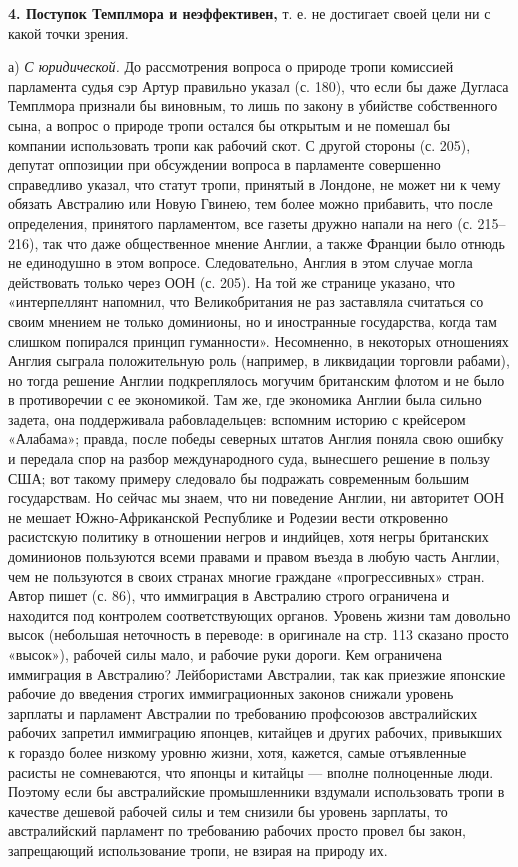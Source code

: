 \textbf{4.  Поступок Темплмора  и  неэффективен,} т.  е. не  достигает
своей цели ни с какой точки зрения.

а)  \emph{С  юридической.} До  рассмотрения  вопроса  о природе  тропи
комиссией парламента  судья сэр Артур  правильно указал (с.  180), что
если бы даже Дугласа Темплмора признали бы виновным, то лишь по закону
в  убийстве собственного  сына, а  вопрос о  природе тропи  остался бы
открытым  и не  помешал  бы компании  использовать  тропи как  рабочий
скот.  С другой  стороны (с.  205), депутат  оппозиции при  обсуждении
вопроса в парламенте совершенно  справедливо указал, что статут тропи,
принятый в  Лондоне, не может  ни к  чему обязать Австралию  или Новую
Гвинею, тем  более можно  прибавить, что после  определения, принятого
парламентом, все газеты  дружно напали на него (с.  215--216), так что
даже  общественное  мнение Англии,  а  также  Франции было  отнюдь  не
единодушно в этом  вопросе. Следовательно, Англия в  этом случае могла
действовать только через ООН (с. 205). На той же странице указано, что
«интерпеллянт напомнил, что Великобритания не раз заставляла считаться
со своим  мнением не только  доминионы, но и  иностранные государства,
когда  там  слишком  попирался   принцип  гуманности».  Несомненно,  в
некоторых отношениях  Англия сыграла  положительную роль  (например, в
ликвидации  торговли рабами),  но тогда  решение Англии  подкреплялось
могучим британским  флотом и не  было в противоречии с  ее экономикой.
Там  же, где  экономика Англии  была сильно  задета, она  поддерживала
рабовладельцев: вспомним историю с  крейсером «Алабама»; правда, после
победы северных  штатов Англия поняла  свою ошибку и передала  спор на
разбор международного суда, вынесшего решение в пользу США; вот такому
примеру  следовало  бы  подражать  современным  большим  государствам.
Но  сейчас  мы  знаем,  что  ни поведение  Англии,  ни  авторитет  ООН
не  мешает  Южно-Африканской  Республике и  Родезии  вести  откровенно
расистскую  политику  в  отношении   негров  и  индийцев,  хотя  негры
британских доминионов пользуются всеми правами и правом въезда в любую
часть  Англии,  чем не  пользуются  в  своих странах  многие  граждане
«прогрессивных» стран. Автор пишет (с. 86), что иммиграция в Австралию
строго ограничена  и находится под контролем  соответствующих органов.
Уровень  жизни там  довольно высок  (небольшая неточность  в переводе:
в  оригинале  на  стр.  113  сказано  просто  «высок»),  рабочей  силы
мало, и  рабочие руки дороги.  Кем ограничена иммиграция  в Австралию?
Лейбористами Австралии, так как  приезжие японские рабочие до введения
строгих иммиграционных  законов снижали  уровень зарплаты  и парламент
Австралии  по  требованию  профсоюзов австралийских  рабочих  запретил
иммиграцию  японцев, китайцев  и других  рабочих, привыкших  к гораздо
более низкому  уровню жизни, хотя, кажется,  самые отъявленные расисты
не  сомневаются, что  японцы и  китайцы ---  вполне полноценные  люди.
Поэтому  если  бы  австралийские промышленники  вздумали  использовать
тропи  в  качестве дешевой  рабочей  силы  и  тем снизили  бы  уровень
зарплаты,  то австралийский  парламент  по  требованию рабочих  просто
провел бы закон, запрещающий использование тропи, не взирая на природу
их.

